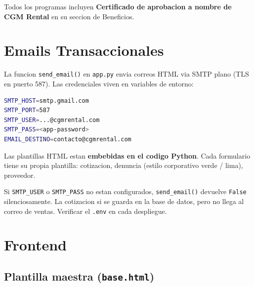 \documentclass[11pt,a4paper]{article}
\begin{document}
Todos los programas incluyen \textbf{Certificado de aprobacion a nombre de
CGM Rental} en su seccion de Beneficios.

\section{Emails Transaccionales}

La funcion \texttt{send\_email()} en \texttt{app.py} envia correos HTML via
SMTP plano (TLS en puerto 587). Las credenciales viven en variables de
entorno:

\begin{lstlisting}[language=bash]
SMTP_HOST=smtp.gmail.com
SMTP_PORT=587
SMTP_USER=...@cgmrental.com
SMTP_PASS=<app-password>
EMAIL_DESTINO=contacto@cgmrental.com
\end{lstlisting}

Las plantillas HTML estan \textbf{embebidas en el codigo Python}. Cada
formulario tiene su propia plantilla: cotizacion, denuncia (estilo corporativo
verde / lima), proveedor.

\begin{warningbox}
Si \texttt{SMTP\_USER} o \texttt{SMTP\_PASS} no estan configurados,
\texttt{send\_email()} devuelve \texttt{False} silenciosamente. La cotizacion
si se guarda en la base de datos, pero no llega al correo de ventas.
Verificar el \texttt{.env} en cada despliegue.
\end{warningbox}

\section{Frontend}

\subsection{Plantilla maestra (\texttt{base.html})}
\end{document}
